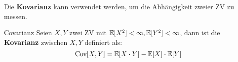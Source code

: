 
Die \textbf{Kovarianz} kann verwendet werden, um die Abhängigkeit zweier ZV zu messen.

\begin{mainbox}{Covarianz}
    Seien $X, Y$ zwei ZV mit $\mathbb{E}[X^2] < \infty, \mathbb{E}[Y^2] < \infty$, dann ist die \textbf{Kovarianz} zwischen $X, Y$ definiert als:
    $$\text{Cov}[X,Y] = \mathbb{E}[X \cdot Y] - \mathbb{E}[X] \cdot \mathbb{E}[Y]$$
\end{mainbox}
